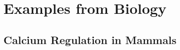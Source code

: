 \section{Examples from Biology}
\label{sec:examples}
\subsection{Calcium Regulation in Mammals}
\begin{frame}{\insertsubsection}

\end{frame}
%
%